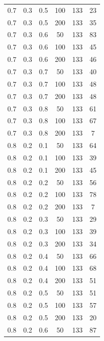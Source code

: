 \documentclass[a4paper,14pt, unknownkeysallowed]{extreport}
\begin{document}
\begin{center}
\begin{longtable}[c]{|c|c|c|c|c|c|}
         0.7 &  0.3 &  0.5 &  100 &   133 &    23 \\
         0.7 &  0.3 &  0.5 &  200 &   133 &    35 \\
        \hline
         0.7 &  0.3 &  0.6 &   50 &   133 &    83 \\
         0.7 &  0.3 &  0.6 &  100 &   133 &    45 \\
         0.7 &  0.3 &  0.6 &  200 &   133 &    46 \\
        \hline
         0.7 &  0.3 &  0.7 &   50 &   133 &    40 \\
         0.7 &  0.3 &  0.7 &  100 &   133 &    48 \\
         0.7 &  0.3 &  0.7 &  200 &   133 &    48 \\
        \hline
         0.7 &  0.3 &  0.8 &   50 &   133 &    61 \\
         0.7 &  0.3 &  0.8 &  100 &   133 &    67 \\
         0.7 &  0.3 &  0.8 &  200 &   133 &     7 \\
        \hline
         0.8 &  0.2 &  0.1 &   50 &   133 &    64 \\
         0.8 &  0.2 &  0.1 &  100 &   133 &    39 \\
         0.8 &  0.2 &  0.1 &  200 &   133 &    45 \\
        \hline
         0.8 &  0.2 &  0.2 &   50 &   133 &    56 \\
         0.8 &  0.2 &  0.2 &  100 &   133 &    78 \\
         0.8 &  0.2 &  0.2 &  200 &   133 &     7 \\
        \hline
         0.8 &  0.2 &  0.3 &   50 &   133 &    29 \\
         0.8 &  0.2 &  0.3 &  100 &   133 &    39 \\
         0.8 &  0.2 &  0.3 &  200 &   133 &    34 \\
        \hline
         0.8 &  0.2 &  0.4 &   50 &   133 &    66 \\
         0.8 &  0.2 &  0.4 &  100 &   133 &    68 \\
         0.8 &  0.2 &  0.4 &  200 &   133 &    51 \\
        \hline
         0.8 &  0.2 &  0.5 &   50 &   133 &    51 \\
         0.8 &  0.2 &  0.5 &  100 &   133 &    57 \\
         0.8 &  0.2 &  0.5 &  200 &   133 &    20 \\
        \hline
         0.8 &  0.2 &  0.6 &   50 &   133 &    87 \\

\end{longtable}
\end{center}
\end{document}
